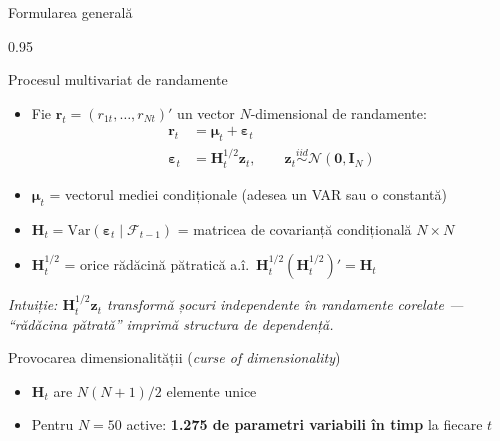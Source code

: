 \documentclass[9pt, aspectratio=169, t]{beamer}
\begin{document}
\begin{frame}{Formularea generală}
    \begin{cminipage}{0.95\textwidth}
    {\footnotesize
    \begin{block}{Procesul multivariat de randamente}
        \begin{itemize}\setlength{\itemsep}{0pt}
            \item Fie $\mathbf{r}_t = (r_{1t}, \ldots, r_{Nt})'$ un vector $N$-dimensional de randamente:
            \begin{align}
                \mathbf{r}_t &= \boldsymbol{\mu}_t + \boldsymbol{\varepsilon}_t \\
                \boldsymbol{\varepsilon}_t &= \mathbf{H}_t^{1/2} \mathbf{z}_t, \qquad \mathbf{z}_t \overset{iid}{\sim} \mathcal{N}(\mathbf{0}, \mathbf{I}_N)
            \end{align}
            \item $\boldsymbol{\mu}_t$ = vectorul mediei condiționale (adesea un VAR sau o constantă)
            \item $\mathbf{H}_t = \text{Var}(\boldsymbol{\varepsilon}_t \mid \mathcal{F}_{t-1})$ = matricea de covarianță condițională $N \times N$
            \item $\mathbf{H}_t^{1/2}$ = orice rădăcină pătratică a.î.\ $\mathbf{H}_t^{1/2}(\mathbf{H}_t^{1/2})' = \mathbf{H}_t$
        \end{itemize}
        \textit{Intuiție: $\mathbf{H}_t^{1/2}\mathbf{z}_t$ transformă șocuri independente în randamente corelate --- ``rădăcina pătrată'' imprimă structura de dependență.}
    \end{block}
    \begin{alertblock}{Provocarea dimensionalității (\textit{curse of dimensionality})}
        \begin{itemize}\setlength{\itemsep}{0pt}
            \item $\mathbf{H}_t$ are $N(N+1)/2$ elemente unice
            \item Pentru $N=50$ active: \textbf{1.275 de parametri variabili în timp} la fiecare $t$
        \end{itemize}
    \end{alertblock}
    }
    \end{cminipage}
\end{frame}
\end{document}
